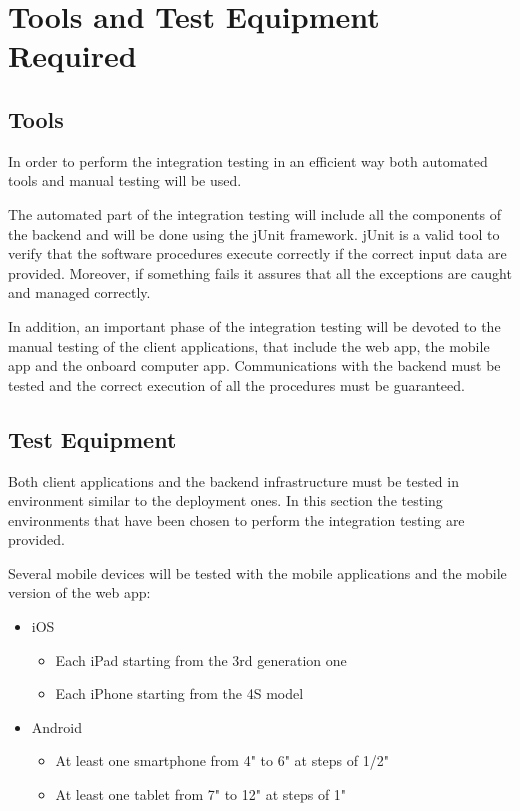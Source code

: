 
\chapter{Tools and Test Equipment Required}
\section{Tools}
In order to perform the integration testing in an efficient way both automated tools and manual testing will be used.

The automated part of the integration testing will include all the components of the backend and will be done using the jUnit framework. jUnit is a valid tool to verify that the software procedures execute correctly if the correct input data are provided. Moreover, if something fails it assures that all the exceptions are caught and managed correctly.

In addition, an important phase of the integration testing will be devoted to the manual testing of the client applications, that include the web app, the mobile app and the onboard computer app. Communications with the backend must be tested and the correct execution of all the procedures must be guaranteed.

\section{Test Equipment}
Both client applications and the backend infrastructure must be tested in environment similar to the deployment ones. In this section the testing environments that have been chosen to perform the integration testing are provided.

Several mobile devices will be tested with the mobile applications and the mobile version of the web app:

\begin{itemize}
	\item iOS
		\begin{itemize}[label={--}]
			\item Each iPad starting from the 3rd generation one
			\item Each iPhone starting from the 4S model
		\end{itemize}
			\item Android
		\begin{itemize}[label={--}]
			\item At least one smartphone from 4" to 6" at steps of 1/2"
			\item At least one tablet from 7" to 12" at steps of 1"
		\end{itemize}
\end{itemize}

